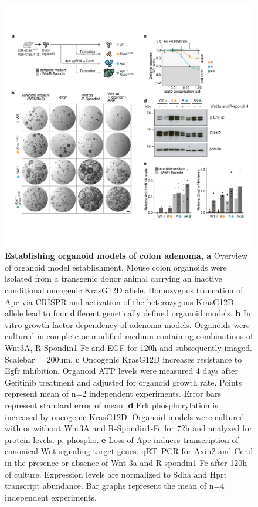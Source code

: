 \begin{flushleft}
\begin{figure}[H]
\centering
\includegraphics[width=\textwidth,
                height=\textheight,
                keepaspectratio]{figures/adenomaprofiling/pdf/fig_1_0.pdf}
\caption{\textbf{Establishing organoid models of colon adenoma, a} Overview of organoid model establishment. Mouse colon organoids were isolated from a transgenic donor animal carrying an inactive conditional oncogenic KrasG12D allele. Homozygous truncation of Apc via CRISPR and activation of the heterozygous KrasG12D allele lead to four different genetically defined organoid models.
\textbf{b} In vitro growth factor dependency of adenoma models. Organoids were cultured in complete or modified medium containing combinations of Wnt3A, R-Spondin1-Fc and EGF for 120h and subsequently imaged. Scalebar = 200um.
\textbf{c}	Oncogenic KrasG12D increases resistance to Egfr inhibition. Organoid ATP levels were measured 4 days after Gefitinib treatment and adjusted for organoid growth rate. Points represent mean of n=2 independent experiments. Error bars represent standard error of mean.  
\textbf{d} Erk phosphorylation is increased by oncogenic KrasG12D. Organoid models were cultured with or without Wnt3A and R-Spondin1-Fc for 72h and analyzed for protein levels. p, phospho.   
\textbf{e}	Loss of Apc induces transcription of canonical Wnt-signaling target genes. qRT–PCR for Axin2 and Ccnd in the presence or absence of Wnt 3a and R-spondin1-Fc after 120h of culture. Expression levels are normalized to Sdha and Hprt transcript abundance. Bar graphs represent the mean of n=4 independent experiments.
}
\label{fig_a10}
\end{figure}
\bigbreak


\end{flushleft}

